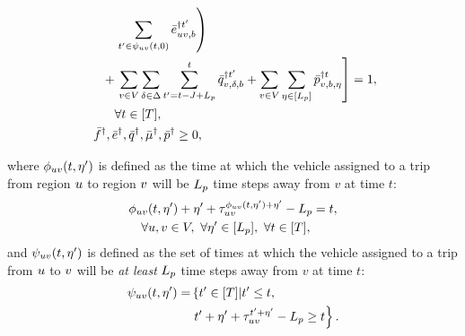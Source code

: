 {\begin{subequations}
\begin{align}
    &\qquad \left. \sum_{t' \in \psi_{\origin \destination}(t, 0)} \lpredreroute{\origin \destination, b}{t'}\right) \nonumber\\ 
    &\quad+ \left. \sum_{\region \in \Region} \sum_{\type \in \Type} \sum_{t' = t-\chargetime + \Lp}^t \lpredcharge{\region,\type,\battery}{t'} + \sum_{\region \in \Region} \sum_{\timetoarrival \in [\Lp]}^{} \lpredpass{\region, \battery, \timetoarrival}{\time} \right] = 1, \nonumber\\
    &\qquad \forall \time \in [\Horizon], \label{eq:fluid-total-flow}\\
    &\ \lpredtripfulfill{}{}, \lpredreroute{}{}, \lpredcharge{}{}, \lpredslack{}{}, \lpredpass{}{} \geq 0, \label{eq:fluid-nonneg}
\end{align}    
\end{subequations}
}

where $\phi_{\origin \destination}(t, \timetoarrival')$ is defined as the time at which the vehicle assigned to a trip from region $\origin$ to region $\destination$ will be $\Lp$ time steps away from $v$ at time $t$:
\begin{align}\label{eq:fluid-phi}
    &\phi_{uv}(t, \eta') + \eta' + \tau_{uv}^{\phi_{uv}(t, \eta') + \eta'} - \Lp = t, \nonumber\\
    &\quad \forall u, v \in \Region,\  \forall \eta' \in [\Lp], \  \forall t \in [T],
\end{align}
and $\psi_{\origin \destination}(t, \eta')$ is defined as the set of times at which the vehicle assigned to a trip from $\origin$ to $\destination$ will be {\em at least} $\Lp$ time steps away from $v$ at time $t$:
\begin{align} \label{eq:fluid-psi}
    \psi_{\origin \destination}(t, \eta') =& \left\{t' \in [T] \lvert t' \leq t, \right. \nonumber \\ 
    &\left. t'+ \eta' + \tau_{uv}^{t'+\eta'} - \Lp \geq t \right\}.
\end{align}

